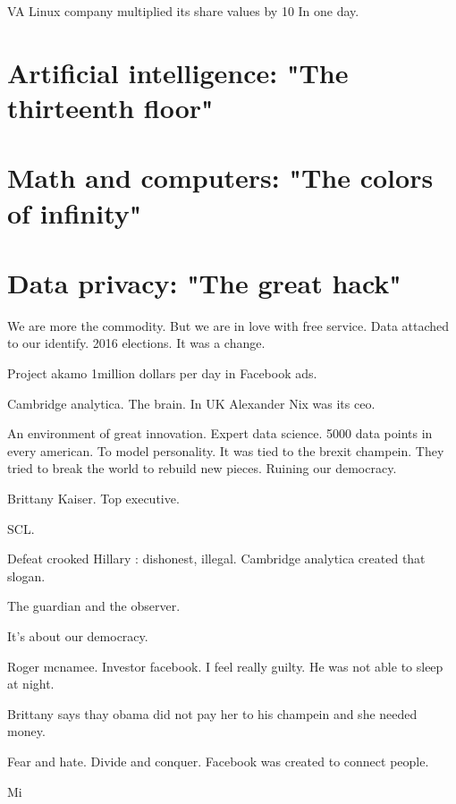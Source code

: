   VA Linux company multiplied its share values by 10 In one day. 
  
 
 
 
    
  \section{Artificial intelligence: "The thirteenth floor"} 
  
   \section{Math and computers: "The colors of infinity"} 
   
 
  
  \section{Data privacy: "The great hack"}
  
  We are more the commodity. But we are in love with free service. Data attached to our identify. 
  2016 elections. It was a change. 
  
  Project akamo 1million dollars per day in Facebook ads. 
  
  Cambridge analytica. The brain. In UK 
  Alexander Nix was its ceo. 
  
  An environment of great innovation. 
  Expert data science. 
  5000 data points in every american. To model personality. 
  It was tied to the brexit champein. 
  They tried to break the world to rebuild new pieces. 
  Ruining our democracy. 
  
  Brittany Kaiser. Top executive. 
  
  SCL. 
  
  Defeat crooked Hillary : dishonest, illegal. Cambridge analytica created that slogan. 
  
  
  The guardian and the observer. 
  
  It's about our democracy. 
  
  Roger mcnamee. Investor facebook. 
  I feel really guilty. He was not able to sleep at night. 
  
  Brittany says thay obama did not pay her to his champein and she needed money. 
  
  Fear and hate. Divide and conquer. Facebook was created to connect people. 
  
  
  
   Mi
  
  
  
